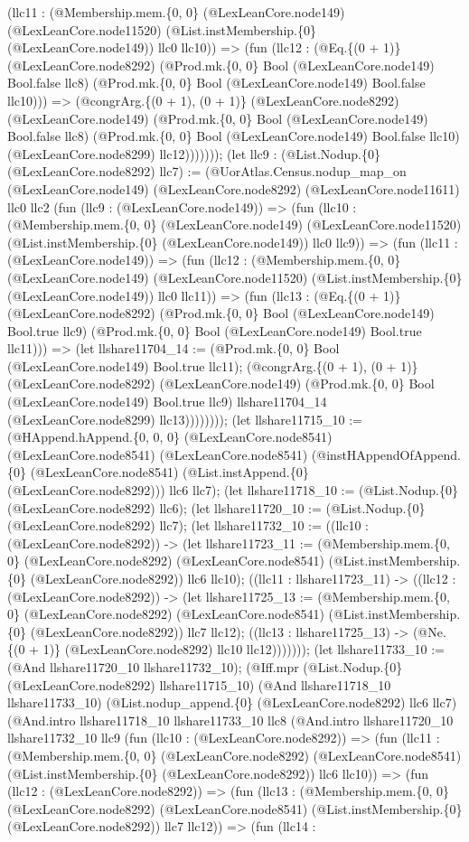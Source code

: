 \documentclass[11pt]{article}
\begin{document}
(llc11 : (@Membership.mem.\{0, 0\} (@LexLeanCore.node149) (@LexLeanCore.node11520) (@List.instMembership.\{0\} (@LexLeanCore.node149)) llc0 llc10)) => (fun (llc12 : (@Eq.\{(0 + 1)\} (@LexLeanCore.node8292) (@Prod.mk.\{0, 0\} Bool (@LexLeanCore.node149) Bool.false llc8) (@Prod.mk.\{0, 0\} Bool (@LexLeanCore.node149) Bool.false llc10))) => (@congrArg.\{(0 + 1), (0 + 1)\} (@LexLeanCore.node8292) (@LexLeanCore.node149) (@Prod.mk.\{0, 0\} Bool (@LexLeanCore.node149) Bool.false llc8) (@Prod.mk.\{0, 0\} Bool (@LexLeanCore.node149) Bool.false llc10) (@LexLeanCore.node8299) llc12))))))); (let llc9 : (@List.Nodup.\{0\} (@LexLeanCore.node8292) llc7) := (@UorAtlas.Census.nodup\_map\_on (@LexLeanCore.node149) (@LexLeanCore.node8292) (@LexLeanCore.node11611) llc0 llc2 (fun (llc9 : (@LexLeanCore.node149)) => (fun (llc10 : (@Membership.mem.\{0, 0\} (@LexLeanCore.node149) (@LexLeanCore.node11520) (@List.instMembership.\{0\} (@LexLeanCore.node149)) llc0 llc9)) => (fun (llc11 : (@LexLeanCore.node149)) => (fun (llc12 : (@Membership.mem.\{0, 0\} (@LexLeanCore.node149) (@LexLeanCore.node11520) (@List.instMembership.\{0\} (@LexLeanCore.node149)) llc0 llc11)) => (fun (llc13 : (@Eq.\{(0 + 1)\} (@LexLeanCore.node8292) (@Prod.mk.\{0, 0\} Bool (@LexLeanCore.node149) Bool.true llc9) (@Prod.mk.\{0, 0\} Bool (@LexLeanCore.node149) Bool.true llc11))) => (let llshare11704\_14 := (@Prod.mk.\{0, 0\} Bool (@LexLeanCore.node149) Bool.true llc11); (@congrArg.\{(0 + 1), (0 + 1)\} (@LexLeanCore.node8292) (@LexLeanCore.node149) (@Prod.mk.\{0, 0\} Bool (@LexLeanCore.node149) Bool.true llc9) llshare11704\_14 (@LexLeanCore.node8299) llc13)))))))); (let llshare11715\_10 := (@HAppend.hAppend.\{0, 0, 0\} (@LexLeanCore.node8541) (@LexLeanCore.node8541) (@LexLeanCore.node8541) (@instHAppendOfAppend.\{0\} (@LexLeanCore.node8541) (@List.instAppend.\{0\} (@LexLeanCore.node8292))) llc6 llc7); (let llshare11718\_10 := (@List.Nodup.\{0\} (@LexLeanCore.node8292) llc6); (let llshare11720\_10 := (@List.Nodup.\{0\} (@LexLeanCore.node8292) llc7); (let llshare11732\_10 := ((llc10 : (@LexLeanCore.node8292)) -> (let llshare11723\_11 := (@Membership.mem.\{0, 0\} (@LexLeanCore.node8292) (@LexLeanCore.node8541) (@List.instMembership.\{0\} (@LexLeanCore.node8292)) llc6 llc10); ((llc11 : llshare11723\_11) -> ((llc12 : (@LexLeanCore.node8292)) -> (let llshare11725\_13 := (@Membership.mem.\{0, 0\} (@LexLeanCore.node8292) (@LexLeanCore.node8541) (@List.instMembership.\{0\} (@LexLeanCore.node8292)) llc7 llc12); ((llc13 : llshare11725\_13) -> (@Ne.\{(0 + 1)\} (@LexLeanCore.node8292) llc10 llc12))))))); (let llshare11733\_10 := (@And llshare11720\_10 llshare11732\_10); (@Iff.mpr (@List.Nodup.\{0\} (@LexLeanCore.node8292) llshare11715\_10) (@And llshare11718\_10 llshare11733\_10) (@List.nodup\_append.\{0\} (@LexLeanCore.node8292) llc6 llc7) (@And.intro llshare11718\_10 llshare11733\_10 llc8 (@And.intro llshare11720\_10 llshare11732\_10 llc9 (fun (llc10 : (@LexLeanCore.node8292)) => (fun (llc11 : (@Membership.mem.\{0, 0\} (@LexLeanCore.node8292) (@LexLeanCore.node8541) (@List.instMembership.\{0\} (@LexLeanCore.node8292)) llc6 llc10)) => (fun (llc12 : (@LexLeanCore.node8292)) => (fun (llc13 : (@Membership.mem.\{0, 0\} (@LexLeanCore.node8292) (@LexLeanCore.node8541) (@List.instMembership.\{0\} (@LexLeanCore.node8292)) llc7 llc12)) => (fun (llc14 : 
\end{document}

